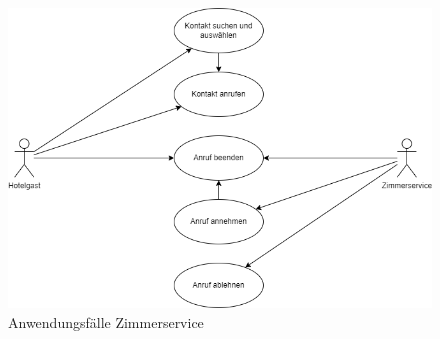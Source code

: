 \begin{figure}[ht!]
    \centering
    \includegraphics[width=\paperwidth-2in]{../assets/img/UML-Anwendungsfalldiagramme-Zimmerservice.drawio}
    \caption{Anwendungsfälle Zimmerservice}
    \label{fig:zimmerservice}
\end{figure}